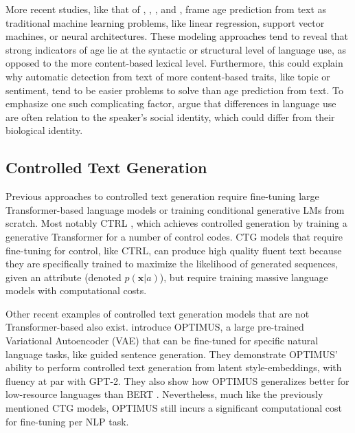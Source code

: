 More recent studies, like that of \cite{nguyen-etal-2011-author}, \cite{nguyen2014gender}, \cite{zheng2019personalized}, and \cite{abdallah2020age}, frame age prediction from text as traditional machine learning problems, like linear regression, support vector machines, or neural architectures. These modeling approaches tend to reveal that strong indicators of age lie at the syntactic or structural level of language use, as opposed to the more content-based lexical level. Furthermore, this could explain why automatic detection from text of more content-based traits, like topic or sentiment, tend to be easier problems to solve than age prediction from text. To emphasize one such complicating factor, \cite{nguyen2014gender} argue that differences in language use are often relation to the speaker's social identity, which could differ from their biological identity. 


\subsection{Controlled Text Generation}
Previous approaches to controlled text generation require fine-tuning large Transformer-based language models or training conditional generative LMs from scratch. Most notably CTRL \citep{keskarCTRL2019}, which achieves controlled generation by training a generative Transformer for a number of control codes. CTG models that require fine-tuning for control, like CTRL, can produce high quality fluent text because they are specifically trained to maximize the likelihood of generated sequences, given an attribute (denoted $p(\textbf{x} | a)$), but require training massive language models with computational costs.

Other recent examples of controlled text generation models that are not Transformer-based also exist. \cite{li-etal-2020-optimus} introduce OPTIMUS, a large pre-trained Variational Autoencoder (VAE) \citep{Kingma2014} that can be fine-tuned for specific natural language tasks, like guided sentence generation. They demonstrate OPTIMUS' ability to perform controlled text generation from latent style-embeddings, with fluency at par with GPT-2. They also show how OPTIMUS generalizes better for low-resource languages than BERT \citep{devlin-etal-2019-bert}. Nevertheless, much like the previously mentioned CTG models, OPTIMUS still incurs a significant computational cost for fine-tuning per NLP task.

